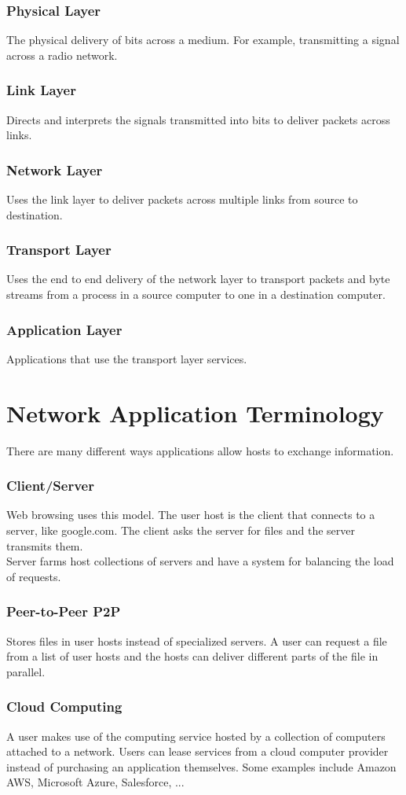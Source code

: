 \subsubsection*{Physical Layer}
The physical delivery of bits across a medium. For example, transmitting a signal across a radio network. 
\subsubsection*{Link Layer}
Directs and interprets the signals transmitted into bits to deliver packets across links. 
\subsubsection*{Network Layer}
Uses the link layer to deliver packets across multiple links from source to destination.
\subsubsection*{Transport Layer}
Uses the end to end delivery of the network layer to transport packets and byte streams from a process in a source computer to one in a destination computer. 
\subsubsection*{Application Layer}
Applications that use the transport layer services.

\section{Network Application Terminology}
There are many different ways applications allow hosts to exchange information. 
\subsubsection*{Client/Server}
Web browsing uses this model. The user host is the client that connects to a server, like google.com. The client asks the server for files and the server transmits them. \\
Server farms host collections of servers and have a system for balancing the load of requests. 
\subsubsection*{Peer-to-Peer P2P}
Stores files in user hosts instead of specialized servers. A user can request a file from a list of user hosts and the hosts can deliver different parts of the file in parallel. \subsubsection*{Cloud Computing}
A user makes use of the computing service hosted by a collection of computers attached to a network. Users can lease services from a cloud computer provider instead of purchasing an application themselves. Some examples include Amazon AWS, Microsoft Azure, Salesforce, ...
